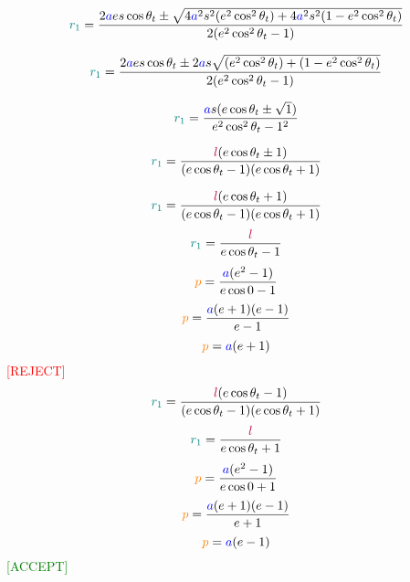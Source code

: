 $$\textcolor{teal}{r_1} = \frac{2\textcolor{blue}{a}\textcolor{black}{e}\textcolor{black}{s}\cos{\textcolor{black}{\theta_t}}\pm\sqrt{4\textcolor{blue}{a}^2\textcolor{black}{s}^2(\textcolor{black}{e}^2\cos^2{\textcolor{black}{\theta_t}}) + 4\textcolor{blue}{a}^2\textcolor{black}{s}^2(1-\textcolor{black}{e}^2\cos^2{\textcolor{black}{\theta_t}})}}{2(\textcolor{black}{e}^2\cos^2{\textcolor{black}{\theta_t}} - 1)}$$

$$\textcolor{teal}{r_1} = \frac{2\textcolor{blue}{a}\textcolor{black}{e}\textcolor{black}{s}\cos{\textcolor{black}{\theta_t}} \pm2\textcolor{blue}{a}\textcolor{black}{s}\sqrt{(\textcolor{black}{e}^2\cos^2{\textcolor{black}{\theta_t}}) + (1 -\textcolor{black}{e}^2\cos^2{\textcolor{black}{\theta_t}})}}{2(\textcolor{black}{e}^2\cos^2{\textcolor{black}{\theta_t}} - 1)}$$

$$\textcolor{teal}{r_1} =  \frac{\textcolor{blue}{a}\textcolor{black}{s}(\textcolor{black}{e}\cos{\textcolor{black}{\theta_t}} \pm\sqrt{1})}{\textcolor{black}{e}^2\cos^2{\textcolor{black}{\theta_t}} - 1^2}$$


$$\textcolor{teal}{r_1} = \frac{\textcolor{purple}{l}(\textcolor{black}{e}\cos{\textcolor{black}{\theta_t}} \pm 1)}{(\textcolor{black}{e}\cos{\textcolor{black}{\theta_t}} - 1)(\textcolor{black}{e}\cos{\textcolor{black}{\theta_t}} + 1)}$$
\bigskip
\begin{multicols}{2}
\raggedcolumns
\noindent
$$\textcolor{teal}{r_1} = \frac{\textcolor{purple}{l}(\textcolor{black}{e}\cos{\textcolor{black}{\theta_t}} + 1)}{(\textcolor{black}{e}\cos{\textcolor{black}{\theta_t}} - 1)(\textcolor{black}{e}\cos{\textcolor{black}{\theta_t}} + 1)}$$
$$\textcolor{teal}{r_1} = \frac{\textcolor{purple}{l}}{\textcolor{black}{e}\cos{\textcolor{black}{\theta_t}} - 1}$$
$$\textcolor{orange}{p} = \frac{\textcolor{blue}{a}(\textcolor{black}{e}^2-1)}{\textcolor{black}{e}\cos{0} - 1}$$
$$\textcolor{orange}{p} = \frac{\textcolor{blue}{a}(\textcolor{black}{e}+1)(\textcolor{black}{e}-1)}{\textcolor{black}{e} - 1}$$
$$\textcolor{orange}{p} = \textcolor{blue}{a}(\textcolor{black}{e}+1)$$
\centering
\textcolor{red}{[REJECT]}
\columnbreak
$$\textcolor{teal}{r_1} = \frac{\textcolor{purple}{l}(\textcolor{black}{e}\cos{\textcolor{black}{\theta_t}} - 1)}{(\textcolor{black}{e}\cos{\textcolor{black}{\theta_t}} - 1)(\textcolor{black}{e}\cos{\textcolor{black}{\theta_t}} + 1)}$$
$$\textcolor{teal}{r_1} = \frac{\textcolor{purple}{l}}{\textcolor{black}{e}\cos{\textcolor{black}{\theta_t}} + 1}$$
$$\textcolor{orange}{p} = \frac{\textcolor{blue}{a}(\textcolor{black}{e}^2-1)}{\textcolor{black}{e}\cos{0} + 1}$$
$$\textcolor{orange}{p} = \frac{\textcolor{blue}{a}(\textcolor{black}{e}+1)(\textcolor{black}{e}-1)}{\textcolor{black}{e} + 1}$$
$$\textcolor{orange}{p} = \textcolor{blue}{a}(\textcolor{black}{e}-1)$$
\centering
\textcolor{green}{[ACCEPT]}
\end{multicols}

